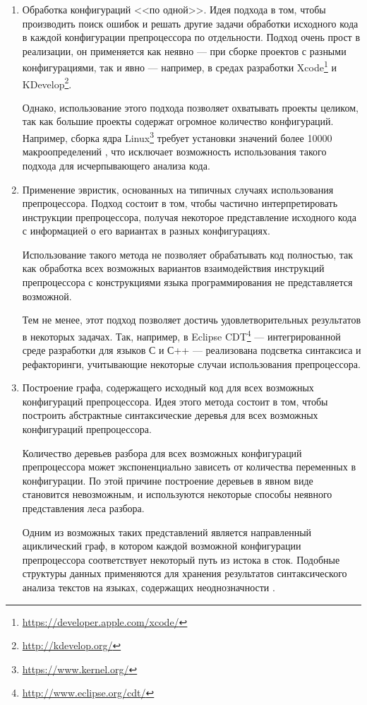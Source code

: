 \begin{enumerate}

\item 

Обработка конфигураций <<по одной>>. Идея подхода в том, чтобы производить поиск ошибок и решать другие задачи обработки исходного кода в каждой конфигурации препроцессора по отдельности. Подход очень прост в реализации, он применяется как неявно --- при сборке проектов с разными конфигурациями, так и явно --- например, в средах разработки Xcode\footnote{\url{https://developer.apple.com/xcode/}} и KDevelop\footnote{\url{http://kdevelop.org/}}.

Однако, использование этого подхода позволяет охватывать проекты целиком, так как большие проекты содержат огромное количество конфигураций. Например, сборка ядра Linux\footnote{\url{https://www.kernel.org/}} требует установки значений более 10000 макроопределений \cite{typechef}, что исключает возможность использования такого подхода для исчерпывающего анализа кода.

\item

Применение эвристик, основанных на типичных случаях использования препроцессора. Подход состоит в том, чтобы частично интерпретировать инструкции препроцессора, получая некоторое представление исходного кода с информацией о его вариантах в разных конфигурациях. 

Использование такого метода не позволяет обрабатывать код полностью, так как обработка всех возможных вариантов взаимодействия инструкций препроцессора с конструкциями языка программирования не представляется возможной.

Тем не менее, этот подход позволяет достичь удовлетворительных результатов в некоторых задачах. Так, например, в Eclipse CDT\footnote{\url{http://www.eclipse.org/cdt/}} --- интегрированной среде разработки для языков С и С++ --- реализована подсветка синтаксиса и рефакторинги, учитывающие некоторые случаи использования препроцессора.

\item

Построение графа, содержащего исходный код для всех возможных конфигураций препроцессора. Идея этого метода состоит в том, чтобы построить абстрактные синтаксические деревья для всех возможных конфигураций препроцессора. 

Количество деревьев разбора для всех возможных конфигураций препроцессора может экспоненциально зависеть от количества переменных в конфигурации. По этой причине построение деревьев в явном виде становится невозможным, и используются некоторые способы неявного представления леса разбора.

Одним из возможных таких представлений является направленный ациклический граф, в котором каждой возможной конфигурации препроцессора соответствует некоторый путь из истока в сток. Подобные структуры данных применяются для хранения результатов синтаксического анализа текстов на языках, содержащих неоднозначности \cite{parseforests}.

\end{enumerate}

